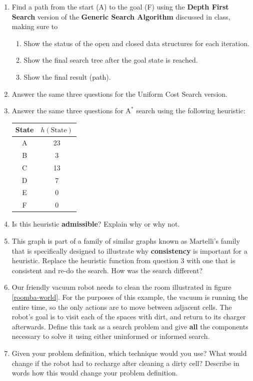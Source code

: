 \documentclass{article} %
\begin{document}
\begin{enumerate}
	\item Find a path from the start (A) to the goal (F) using the \textbf{Depth First Search} version of the \textbf{Generic Search Algorithm} discussed in class, making sure to
	\begin{enumerate}
		\item Show the status of the open and closed data structures for each iteration.
		\item Show the final search tree after the goal state is reached.
		\item Show the final result (path).
	\end{enumerate}
	\item Answer the same three questions for the Uniform Cost Search version.
	\item Answer the same three questions for \(\textrm{A}^*\) search using the following heuristic: \begin{tabular}{c|c}State & \(h(\textrm{State})\)\\ \hline A & 23\\ B& 3\\ C& 13\\ D& 7\\ E& 0\\ F&0\end{tabular}
	\item Is this heuristic \textbf{admissible}? Explain why or why not.
	\item This graph is part of a family of similar graphs known as Martelli's family that is specifically designed to illustrate why \textbf{consistency} is important for a heuristic. Replace the heuristic function from question 3 with one that is consistent and re-do the search. How was the search different?
	\item Our friendly vacuum robot needs to clean the room illustrated in figure \ref{roomba-world}. For the purposes of this example, the vacuum is running the entire time, so the only actions are to move between adjacent cells. The robot's goal is to visit each of the spaces with dirt, and return to its charger afterwards. Define this task as a search problem and give \textbf{all} the components necessary to solve it using either uninformed or informed search.
	\item Given your problem definition, which technique would you use?
	What would change if the robot had to recharge after cleaning a dirty cell? Describe in words how this would change your problem definition.

\end{enumerate}
\end{document}
